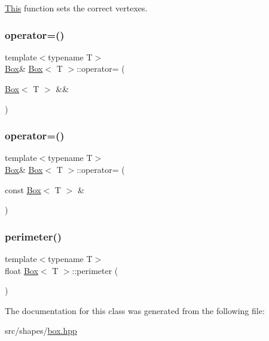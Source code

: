 \mbox{\hyperlink{classThis}{This}} function sets the correct vertexes. 

\mbox{\label{classBox_a09995e3360b336b8a477d84804a5a70d}} 
\subsubsection{\texorpdfstring{operator=()}{operator=()}\hspace{0.1cm}{\footnotesize\ttfamily [1/2]}}
{\footnotesize\ttfamily template$<$typename T$>$ \\
\mbox{\hyperlink{classBox}{Box}}\& \mbox{\hyperlink{classBox}{Box}}$<$ T $>$\+::operator= (\begin{DoxyParamCaption}\item[{\mbox{\hyperlink{classBox}{Box}}$<$ T $>$ \&\&}]{ }\end{DoxyParamCaption})\hspace{0.3cm}{\ttfamily [default]}}

\mbox{\label{classBox_a6ea0d233bdcce789b46384d22601da8d}} 
\subsubsection{\texorpdfstring{operator=()}{operator=()}\hspace{0.1cm}{\footnotesize\ttfamily [2/2]}}
{\footnotesize\ttfamily template$<$typename T$>$ \\
\mbox{\hyperlink{classBox}{Box}}\& \mbox{\hyperlink{classBox}{Box}}$<$ T $>$\+::operator= (\begin{DoxyParamCaption}\item[{const \mbox{\hyperlink{classBox}{Box}}$<$ T $>$ \&}]{ }\end{DoxyParamCaption})\hspace{0.3cm}{\ttfamily [default]}}

\mbox{\label{classBox_ac64e9d619b0f3b991174a2ac49fef899}} 
\subsubsection{\texorpdfstring{perimeter()}{perimeter()}}
{\footnotesize\ttfamily template$<$typename T$>$ \\
float \mbox{\hyperlink{classBox}{Box}}$<$ T $>$\+::perimeter (\begin{DoxyParamCaption}{ }\end{DoxyParamCaption})}



The documentation for this class was generated from the following file\+:\begin{DoxyCompactItemize}
\item 
src/shapes/\mbox{\hyperlink{box_8hpp}{box.\+hpp}}\end{DoxyCompactItemize}
